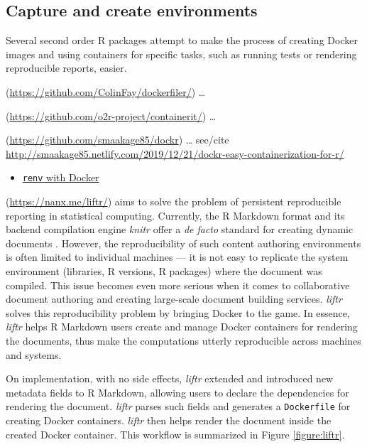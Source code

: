 \hypertarget{capture-and-create-environments-nuest}{%
\subsection{\texorpdfstring{Capture and create environments
\citep{nuest}}{Capture and create environments {[}@nuest{]}}}\label{capture-and-create-environments-nuest}}

\label{envs}

Several second order R packages attempt to make the process of creating
Docker images and using containers for specific tasks, such as running
tests or rendering reproducible reports, easier.

\textbf{}
(\url{https://github.com/ColinFay/dockerfiler/}) \ldots{}

\textbf{}
(\url{https://github.com/o2r-project/containerit/}) \ldots{}

\textbf{} (\url{https://github.com/smaakage85/dockr})
\ldots{} see/cite
\url{http://smaakage85.netlify.com/2019/12/21/dockr-easy-containerization-for-r/}

\begin{itemize}
\tightlist
\item
  \href{https://rstudio.github.io/renv/articles/docker.html}{\texttt{renv}
  with Docker}
\end{itemize}

\textbf{} (\url{https://nanx.me/liftr/}) \citep{liftr2019}
aims to solve the problem of persistent reproducible reporting in
statistical computing. Currently, the R Markdown format and its backend
compilation engine \emph{knitr} offer a \emph{de facto} standard for
creating dynamic documents \citep{xie2018}. However, the reproducibility
of such content authoring environments is often limited to individual
machines --- it is not easy to replicate the system environment
(libraries, R versions, R packages) where the document was compiled.
This issue becomes even more serious when it comes to collaborative
document authoring and creating large-scale document building services.
\emph{liftr} solves this reproducibility problem by bringing Docker to
the game. In essence, \emph{liftr} helps R Markdown users create and
manage Docker containers for rendering the documents, thus make the
computations utterly reproducible across machines and systems.

On implementation, with no side effects, \emph{liftr} extended and
introduced new metadata fields to R Markdown, allowing users to declare
the dependencies for rendering the document. \emph{liftr} parses such
fields and generates a \texttt{Dockerfile} for creating Docker
containers. \emph{liftr} then helps render the document inside the
created Docker container. This workflow is summarized in Figure
\ref{figure:liftr}.

